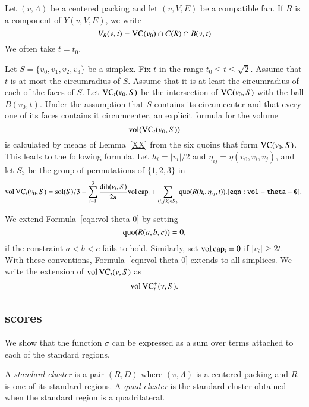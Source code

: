 Let $(v,\Lambda)$ be a centered packing and let $(v,V,E)$ be a compatible
fan.
If $R$ is a component of $Y(v,V,E)$, we write 
  $$
  V_R(v,t) = {\operatorname{VC}}(v_0)\cap C(R)\cap B(v,t)
  $$
We often
take $t=t_0$.



 Let $S=\{v_0,v_1,v_2,v_3\}$ be a simplex. Fix $t$ in the range
$t_0\le t\le\sqrt2$.  Assume that $t$ is at most the circumradius
of $S$. Assume that it is at least the circumradius of each of the
faces of $S$.  Let ${\operatorname{VC}}_t(v_0,S)$ be the intersection of
${\operatorname{VC}}(v_0,S)$ with the ball $B(v_0,t)$. Under the assumption
that $S$ contains its circumcenter and that every one of its faces
contains it circumcenter, an explicit formula for the volume
$${\operatorname{vol}}({\operatorname{VC}}_t(v_0,S))$$ is calculated by means of
Lemma~\ref{XX} from the six quoins that form ${\operatorname{VC}}(v_0,S)$.
This leads to the
following formula. Let $h_i = |v_i|/2$ and
$\eta_{ij}=\eta(v_0,v_i,v_j)$, and let $S_3$ be the group of
permutations of $\{1,2,3\}$ in
\begin{equation}
   \op{vol}\,\op{VC}_t(v_0,S) =
   \sol(S)/3 - \sum_{i=1}^3 \frac{\dih(v_i,S)}{2\pi}\op{vol}\,\op{cap_i}
   +\sum_{(i,j,k)\in S_3} \quo(R(h_i,\eta_{ij},t)).
   \tlabel{eqn:vol-theta-0}
\end{equation}


We extend Formula~\ref{eqn:vol-theta-0} by setting
    $$\operatorname{quo}(R(a,b,c)) = 0,$$
if the constraint $a < b < c$ fails to hold.  Similarly, set
${\operatorname{vol}}\,{\operatorname{cap}}_i=0$ if $|v_i|\ge 2t$.  With these
conventions,  Formula~\ref{eqn:vol-theta-0} extends to all
simplices.  We write the extension of ${\operatorname{vol}}\,{\operatorname{VC}}_t(v,S)$
as
$${\operatorname{vol}}\,{{\operatorname{VC}}^+_t}(v,S).$$


\subsection{scores}

We show that the function $\sigma$ can be expressed as a sum over
terms attached to each of the standard regions.

\begin{definition} 
A {\it standard cluster\/} is a pair $(R,D)$ where $(v,\Lambda)$ is a
centered packing and $R$ is one of its standard regions.  A {\it
quad cluster\/} is the standard cluster obtained when the standard
region is a quadrilateral.
\end{definition}
%

